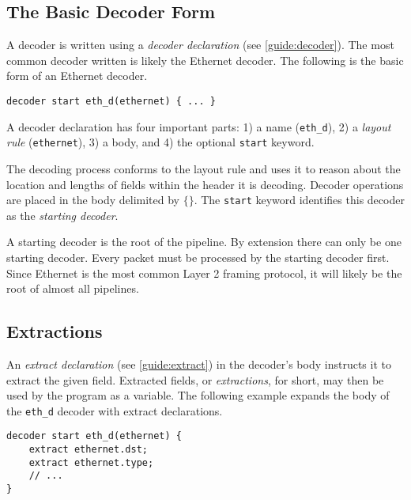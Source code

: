 \subsection{The Basic Decoder Form} \label{tut:basic_decoder}

A decoder is written using a \textit{decoder declaration} (see \ref{guide:decoder}).
The most common decoder written is likely the Ethernet decoder. The following
is the basic form of an Ethernet decoder.

\begin{codepage}
\begin{lstlisting}
decoder start eth_d(ethernet) { ... }
\end{lstlisting}
\end{codepage}

A decoder declaration has four important parts: 
1) a name (\texttt{eth\_d}), 
2) a \textit{layout rule} (\texttt{ethernet}),
3) a body, and
4) the optional \texttt{start} keyword.

The decoding process conforms to the layout rule and uses it to reason
about the location and lengths of fields within the header it is decoding.
Decoder operations are placed in the body delimited by $\lbrace\rbrace$.
The \texttt{start} keyword identifies this decoder as the \emph{starting
decoder}. 

A starting decoder is the root of the pipeline.
By extension there can only be one starting decoder.
Every packet must be processed by the starting decoder first.
Since Ethernet is the most common Layer 2 framing protocol, it will
likely be the root of almost all pipelines.

\subsection{Extractions} \label{tut:decoder_extract}

An \textit{extract declaration} (see \ref{guide:extract}) in the decoder's body
instructs it to extract the given field. Extracted fields, or \emph{extractions},
for short, may then be used by the program as a variable.
The following example expands the body of the \texttt{eth\_d} decoder 
with extract declarations.

\begin{codepage}
\begin{lstlisting}
decoder start eth_d(ethernet) {
	extract ethernet.dst;
	extract ethernet.type;
	// ...
}
\end{lstlisting}
\end{codepage}

